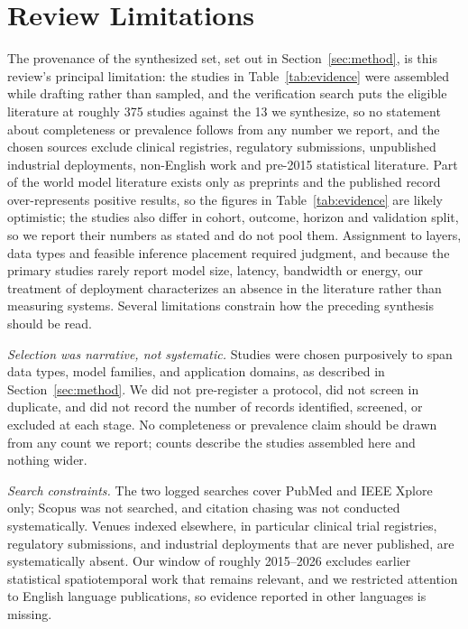 \documentclass[journal]{IEEEtran}
\newif\ifsubmission
\begin{document}
\section{Review Limitations}
\label{sec:limitations}
\ifsubmission
The provenance of the synthesized set, set out in Section~\ref{sec:method}, is this review's principal limitation: the studies in Table~\ref{tab:evidence} were assembled while drafting rather than sampled, and the verification search puts the eligible literature at roughly 375 studies against the 13 we synthesize, so no statement about completeness or prevalence follows from any number we report, and the chosen sources exclude clinical registries, regulatory submissions, unpublished industrial deployments, non-English work and pre-2015 statistical literature. Part of the world model literature exists only as preprints and the published record over-represents positive results, so the figures in Table~\ref{tab:evidence} are likely optimistic; the studies also differ in cohort, outcome, horizon and validation split, so we report their numbers as stated and do not pool them. Assignment to layers, data types and feasible inference placement required judgment, and because the primary studies rarely report model size, latency, bandwidth or energy, our treatment of deployment characterizes an absence in the literature rather than measuring systems.
\else
Several limitations constrain how the preceding synthesis should be read.

\emph{Selection was narrative, not systematic.} Studies were chosen purposively to span data types, model families, and application domains, as described in Section~\ref{sec:method}. We did not pre-register a protocol, did not screen in duplicate, and did not record the number of records identified, screened, or excluded at each stage. No completeness or prevalence claim should be drawn from any count we report; counts describe the studies assembled here and nothing wider.

\emph{Search constraints.} The two logged searches cover PubMed and IEEE Xplore only; Scopus was not searched, and citation chasing was not conducted systematically. Venues indexed elsewhere, in particular clinical trial registries, regulatory submissions, and industrial deployments that are never published, are systematically absent. Our window of roughly 2015--2026 excludes earlier statistical spatiotemporal work that remains relevant, and we restricted attention to English language publications, so evidence reported in other languages is missing.
\end{document}
